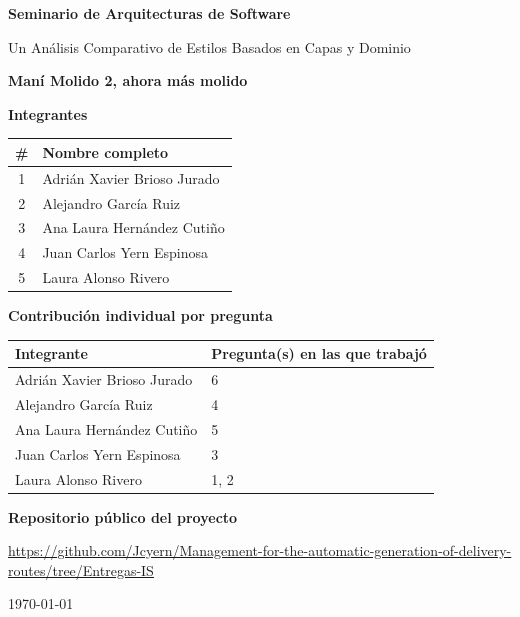 \documentclass[12pt,a4paper]{article}
\newcommand{\NombreEquipo}{Maní Molido 2, ahora más molido}
\newcommand{\IntegranteA}{Adrián Xavier Brioso Jurado}
\newcommand{\IntegranteB}{Alejandro García Ruiz}
\newcommand{\IntegranteC}{Ana Laura Hernández Cutiño}
\newcommand{\IntegranteD}{Juan Carlos Yern Espinosa}
\newcommand{\IntegranteE}{Laura Alonso Rivero}
\newcommand{\PreguntasA}{6}
\newcommand{\PreguntasB}{4}
\newcommand{\PreguntasC}{5}
\newcommand{\PreguntasD}{3}
\newcommand{\PreguntasE}{1, 2}
\newcommand{\RepoURL}{\url{https://github.com/Jcyern/Management-for-the-automatic-generation-of-delivery-routes/tree/Entregas-IS}}
\begin{document}
\begin{titlepage}
\centering

{\Large\bfseries Seminario de Arquitecturas de Software\par}
\vspace{0.3cm}
{\large Un Análisis Comparativo de Estilos Basados en Capas y Dominio\par}

\vspace{1.8cm}

{\large\bfseries \NombreEquipo\par}

\vspace{1.6cm}

{\large\bfseries Integrantes\par}
\vspace{0.4cm}
{\small
\begin{tabular}{@{}cp{9cm}@{}}
\hline
\# & Nombre completo \\
\hline
1 & \IntegranteA \\[0.4em]
2 & \IntegranteB \\[0.4em]
3 & \IntegranteC \\[0.4em]
4 & \IntegranteD \\[0.4em]
5 & \IntegranteE \\
\hline
\end{tabular}
\par}

\vspace{1.6cm}

{\large\bfseries Contribución individual por pregunta\par}
\vspace{0.4cm}
{\small
\begin{tabular}{@{}p{6cm}p{8.5cm}@{}}
\hline
Integrante & Pregunta(s) en las que trabajó \\
\hline
\IntegranteA & \PreguntasA \\[0.4em]
\IntegranteB & \PreguntasB \\[0.4em]
\IntegranteC & \PreguntasC \\[0.4em]
\IntegranteD & \PreguntasD \\[0.4em]
\IntegranteE & \PreguntasE \\
\hline
\end{tabular}
\par}

\vspace{1.6cm}

{\large\bfseries Repositorio público del proyecto\par}
\vspace{0.4cm}
\RepoURL

\vfill
{\large \today\par}

\end{titlepage}
\end{document}
